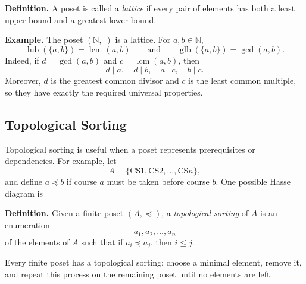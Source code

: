 \documentclass{article}
\begin{document}
\textbf{Definition.} A poset is called a \textit{lattice} if every pair of elements has both a least upper bound and a greatest lower bound.

\textbf{Example.} The poset $(\mathbb{N}, \mid)$ is a lattice. For $a, b \in \mathbb{N}$,
\[
\operatorname{lub}(\{a,b\}) = \operatorname{lcm}(a,b)
\qquad\text{and}\qquad
\operatorname{glb}(\{a,b\}) = \gcd(a,b).
\]
Indeed, if $d = \gcd(a,b)$ and $c = \operatorname{lcm}(a,b)$, then
\[
d \mid a,\quad d \mid b,\quad a \mid c,\quad b \mid c.
\]
Moreover, $d$ is the greatest common divisor and $c$ is the least common multiple, so they have exactly the required universal properties.

\subsection*{Topological Sorting}

Topological sorting is useful when a poset represents prerequisites or dependencies. For example, let
\[
A = \{\mathrm{CS1}, \mathrm{CS2}, \dots, \mathrm{CS}n\},
\]
and define $a \preceq b$ if course $a$ must be taken before course $b$. One possible Hasse diagram is
\begin{center}
\end{center}

\textbf{Definition.} Given a finite poset $(A, \preceq)$, a \textit{topological sorting} of $A$ is an enumeration
\[
a_1, a_2, \dots, a_n
\]
of the elements of $A$ such that if $a_i \preceq a_j$, then $i \le j$.

Every finite poset has a topological sorting: choose a minimal element, remove it, and repeat this process on the remaining poset until no elements are left.
\end{document}
